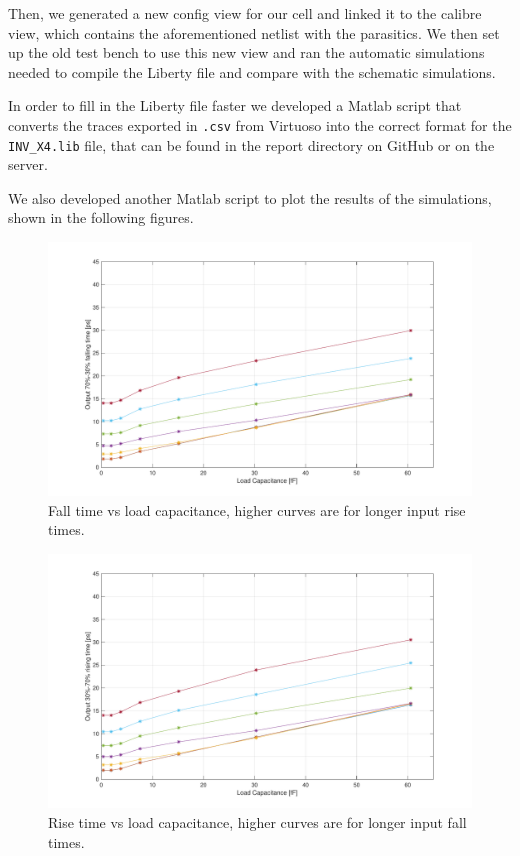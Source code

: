 \documentclass[a4paper]{article}
\begin{document}
Then, we generated a new config view for our cell and linked it to the calibre view, which contains the aforementioned netlist with the parasitics. We then set up the old test bench to use this new view and ran the automatic simulations needed to compile the Liberty file and compare with the schematic simulations.

In order to fill in the Liberty file faster we developed a Matlab script that converts the traces exported in \texttt{.csv} from Virtuoso into the correct format for the \texttt{INV\_X4.lib} file, that can be found in the report directory on GitHub or on the server.

We also developed another Matlab script to plot the results of the simulations, shown in the following figures.
\begin{figure}[H]
	\centering
	\includegraphics[width=\linewidth]{../INV_X4/simulations/t_F.pdf}
	\caption{Fall time vs load capacitance, higher curves are for longer input rise times.}
	\label{fig:inv_t_F}
\end{figure}
\begin{figure}[H]
	\centering
	\includegraphics[width=\linewidth]{../INV_X4/simulations/t_R.pdf}
	\caption{Rise time vs load capacitance, higher curves are for longer input fall times.}
	\label{fig:inv_t_R}
\end{figure}
\end{document}
